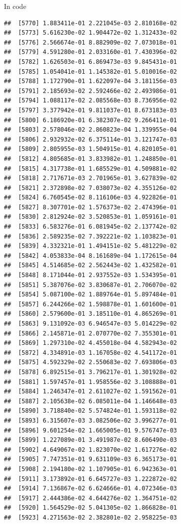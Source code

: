 \documentclass[ignorenonframetext,]{beamer}
\begin{document}
\begin{frame}[fragile]{In code}
\begin{verbatim}
##  [5770] 1.883411e-01 2.221045e-03 2.810168e-02
##  [5773] 5.616230e-02 1.904472e-02 1.312433e-02
##  [5776] 2.566674e-01 8.882909e-02 7.073018e-01
##  [5779] 4.591280e-01 2.033160e-01 7.430396e-02
##  [5782] 1.626503e-01 6.869473e-03 9.845431e-01
##  [5785] 1.054041e-01 1.145382e-01 5.010016e-02
##  [5788] 1.172790e-01 1.622097e-04 3.181156e-03
##  [5791] 2.185693e-02 2.592466e-02 2.493986e-01
##  [5794] 1.088117e-02 2.085568e-03 8.736956e-02
##  [5797] 3.377942e-01 9.811037e-01 8.673183e-03
##  [5800] 6.186920e-01 6.382307e-02 9.266411e-01
##  [5803] 2.578046e-02 2.860823e-04 1.339955e-04
##  [5806] 2.932932e-02 6.375114e-01 3.121747e-03
##  [5809] 2.805955e-03 1.504915e-01 4.820105e-01
##  [5812] 4.805685e-01 3.833982e-01 1.248850e-01
##  [5815] 4.317738e-01 1.685529e-01 4.509881e-02
##  [5818] 2.717671e-03 2.701965e-01 3.627839e-02
##  [5821] 2.372898e-02 7.038073e-02 4.355126e-02
##  [5824] 6.760545e-02 8.116106e-03 4.922826e-01
##  [5827] 8.307701e-02 1.576373e-02 2.474396e-01
##  [5830] 2.812924e-02 3.520853e-01 1.059161e-01
##  [5833] 6.583276e-01 6.081945e-02 2.137742e-02
##  [5836] 2.589235e-02 7.392221e-02 1.103823e-01
##  [5839] 4.332321e-01 1.494151e-02 5.481229e-02
##  [5842] 4.053833e-04 8.161689e-04 1.172615e-04
##  [5845] 4.514685e-02 2.562443e-02 1.432582e-01
##  [5848] 8.171044e-01 2.937552e-03 1.534395e-01
##  [5851] 5.387076e-02 3.830687e-01 2.706070e-02
##  [5854] 5.087100e-02 1.889764e-01 5.897484e-01
##  [5857] 6.244266e-02 1.598878e-01 1.601600e-01
##  [5860] 2.579600e-01 3.185110e-01 4.865269e-01
##  [5863] 9.131092e-03 6.946547e-03 5.014229e-02
##  [5866] 2.145871e-01 2.070770e-02 7.355301e-01
##  [5869] 1.297310e-02 4.455018e-04 4.582943e-02
##  [5872] 4.334891e-03 1.167058e-02 4.541172e-01
##  [5875] 4.592329e-02 2.550683e-02 7.693806e-03
##  [5878] 6.892515e-01 3.796217e-01 1.301928e-02
##  [5881] 1.597457e-01 1.958556e-02 3.108888e-01
##  [5884] 1.246347e-01 2.611027e-02 1.591562e-01
##  [5887] 2.105638e-02 6.085011e-04 1.146648e-03
##  [5890] 3.718840e-02 5.574824e-01 1.593118e-02
##  [5893] 6.315607e-03 3.082506e-02 3.996277e-01
##  [5896] 9.601254e-02 1.665005e-01 9.576747e-03
##  [5899] 1.227089e-01 3.491987e-02 8.606490e-03
##  [5902] 4.649067e-02 1.823070e-02 1.617276e-02
##  [5905] 7.747351e-01 9.631109e-03 6.365173e-01
##  [5908] 2.194180e-02 1.107905e-01 6.942363e-01
##  [5911] 3.173892e-01 6.645727e-03 1.222872e-02
##  [5914] 7.136867e-02 6.624666e-01 4.072346e-03
##  [5917] 2.444386e-02 4.644276e-02 1.364751e-02
##  [5920] 1.564529e-02 5.041305e-02 1.866828e-01
##  [5923] 4.271563e-02 2.382801e-02 2.958225e-03

\end{verbatim}
\end{frame}
\end{document}
